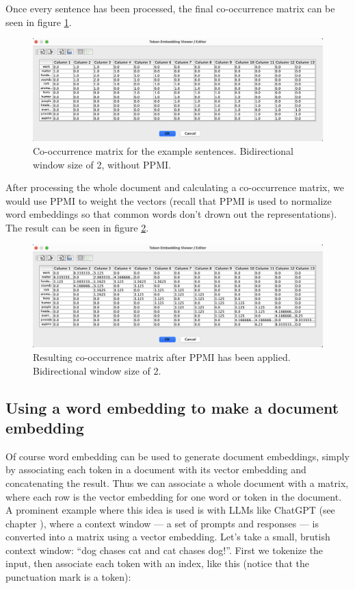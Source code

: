 Once every sentence has been processed, the final co-occurrence matrix can be seen in figure \ref{coocExample}.

\begin{figure}[h]
    \centering
    \includegraphics[scale=0.4]{./images/full_cooc_matrix.png}
    \caption[Generated using Simbrain.]{Co-occurrence matrix for the example sentences. Bidirectional window size of 2, without PPMI.}
 \label{coocExample}
\end{figure}

After processing the whole document and calculating a co-occurrence matrix, we would use PPMI to weight the vectors (recall that PPMI is used to normalize word embeddings so that common words don't drown out the representations). The result can be seen in figure \ref{ppmiExample}.

\begin{figure}[h]
    \centering
    \includegraphics[scale=0.4]{./images/weighted_cooc_matrix.png}
    \caption[Generated using Simbrain.]{Resulting co-occurrence matrix after PPMI has been applied. Bidirectional window size of 2.}
 \label{ppmiExample}
\end{figure}

\subsection{Using a word embedding to make a document embedding}\label{wordEmbeddingMatrix}

Of course word embedding can be used to generate document embeddings, simply by associating each token in a document with its vector embedding and concatenating the result. Thus we can associate a whole document with a matrix, where each row is the vector embedding for one word or token in the document. A prominent example where this idea is used is with LLMs like ChatGPT (see chapter ), where a context window --- a set of prompts and responses --- is converted into a matrix using a vector embedding. Let's take a small, brutish context window:  ``dog chases cat and cat chases dog!''.  First we tokenize the input, then associate each token with an index, like this (notice that the punctuation mark is a token):


